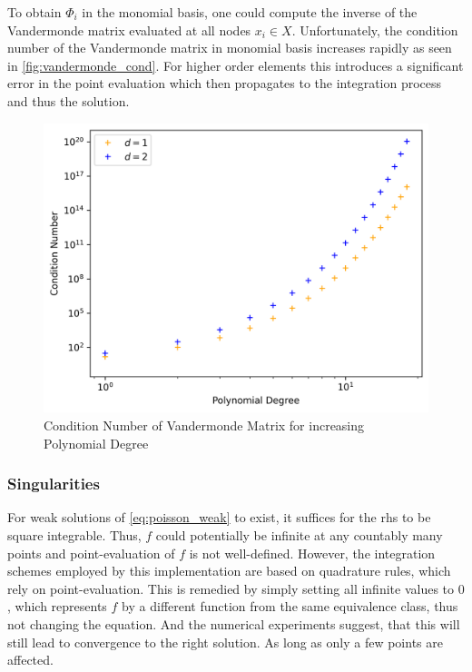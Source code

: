 \documentclass[11pt,a4paper]{article}
\begin{document}
\begin{multicols}{2}
To obtain $\Phi_i$ in the monomial basis, one could compute the inverse of the Vandermonde matrix evaluated at all
nodes $x_i \in X$. Unfortunately, the condition number of the Vandermonde matrix in monomial basis increases rapidly
as seen in \autoref{fig:vandermonde_cond}. For higher order elements this introduces a significant error in the point evaluation
which then propagates to the integration process and thus the solution.
\begin{figure}[H]
  \centering
  \includegraphics[width=1\linewidth]{vandermonde_cond}
  \caption{Condition Number of Vandermonde Matrix for increasing Polynomial Degree}
  \label{fig:vandermonde_cond}
\end{figure}

\subsubsection*{Singularities}
For weak solutions of \autoref{eq:poisson_weak} to exist, it suffices for the rhs to be square integrable.
Thus, $f$ could potentially be infinite at any countably many points
and point-evaluation of $f$ is not well-defined. However, the integration schemes employed by this
implementation are based on quadrature rules, which rely on point-evaluation. This is remedied by
simply setting all infinite values to $0$, which represents $f$ by a different function from
the same equivalence class, thus not changing the equation. And the numerical experiments suggest, that
this will still lead to convergence to the right solution. As long as only a few points are affected.


\end{multicols}
\end{document}
